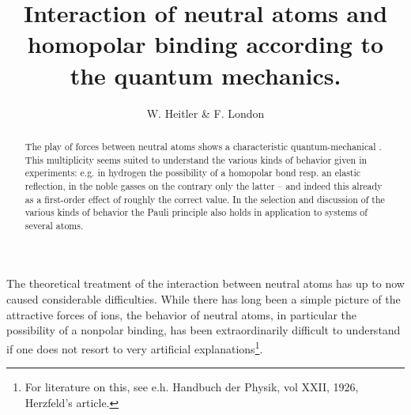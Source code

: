 \begin{paper}{1}
\begin{header}
\title{Interaction of neutral atoms and homopolar binding according to the quantum mechanics.}
\author{W. Heitler \& F. London}
\makeheader
\end{header}
\newcommand{\angstrom}{\mbox{\normalfont\AA}}
\renewcommand{\H}{\El{H}}
\newcommand{\He}{\El{He}}


\begin{abstract}
The play of forces between neutral atoms shows a characteristic quantum-mechanical . This multiplicity seems suited to understand the various kinds of behavior given in experiments: e.g. in hydrogen the possibility of a homopolar bond resp. an elastic reflection, in the noble gasses on the contrary only the latter -- and indeed this already as a first-order effect of roughly the correct value. In the selection and discussion of the various kinds of behavior the Pauli principle also holds in application to systems of several atoms.
\end{abstract}

The theoretical treatment of the interaction between neutral atoms has up to now caused considerable difficulties. While there has long been a simple picture of the attractive forces of ions, the behavior of neutral atoms, in particular the possibility of a nonpolar binding, has been extraordinarily difficult to understand if one does not resort to very artificial explanations\footnote{For literature on this, see e.h. Handbuch der Physik, vol XXII, 1926, Herzfeld's article.}. 


\end{paper}
